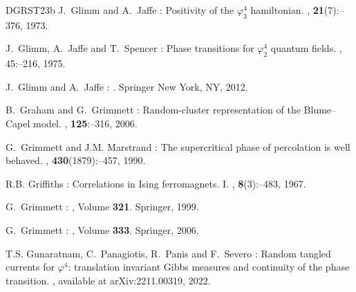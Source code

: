 \documentclass[11pt,a4paper]{article}
\theoremstyle{definition}
\numberwithin{equation}{section}
\begin{document}
\begin{thebibliography}{DGRST23b}
J.~\bgroup\fonteauteurs\bgroup Glimm\egroup\egroup{} and A.~\bgroup\fonteauteurs\bgroup Jaffe\egroup\egroup{} :
\newblock Positivity of the $\varphi^4_3$ hamiltonian.
, \textbf{21}(7)\string:--376, 1973.

J.~\bgroup\fonteauteurs\bgroup Glimm\egroup\egroup{}, A.~\bgroup\fonteauteurs\bgroup Jaffe\egroup\egroup{} and T.~\bgroup\fonteauteurs\bgroup Spencer\egroup\egroup{} :
\newblock Phase transitions for $\varphi^4_2$ quantum fields.
, 45\string:--216, 1975.

J.~\bgroup\fonteauteurs\bgroup Glimm\egroup\egroup{} and A.~\bgroup\fonteauteurs\bgroup Jaffe\egroup\egroup{} :
.
\newblock Springer New York, NY, 2012.

B.~\bgroup\fonteauteurs\bgroup Graham\egroup\egroup{} and G.~\bgroup\fonteauteurs\bgroup Grimmett\egroup\egroup{} :
\newblock Random-cluster representation of the Blume--Capel model.
, \textbf{125}\string:--316, 2006.

G.~\bgroup\fonteauteurs\bgroup Grimmett\egroup\egroup{} and J.M. \bgroup\fonteauteurs\bgroup Marstrand\egroup\egroup{} :
\newblock The supercritical phase of percolation is well behaved.
, \textbf{430}(1879)\string:--457, 1990.


R.B. \bgroup\fonteauteurs\bgroup Griffiths\egroup\egroup{} :
\newblock Correlations in {I}sing ferromagnets. {I}.
, \textbf{8}(3)\string:--483, 1967.

G.~\bgroup\fonteauteurs\bgroup Grimmett\egroup\egroup{} :
, Volume \textbf{321}.
\newblock Springer, 1999.

G.~\bgroup\fonteauteurs\bgroup Grimmett\egroup\egroup{} :
, Volume \textbf{333}.
\newblock Springer, 2006.

T.S. \bgroup\fonteauteurs\bgroup Gunaratnam\egroup\egroup{}, C.~\bgroup\fonteauteurs\bgroup Panagiotis\egroup\egroup{}, R.~\bgroup\fonteauteurs\bgroup Panis\egroup\egroup{} and F.~\bgroup\fonteauteurs\bgroup Severo\egroup\egroup{} :
\newblock Random tangled currents for $\varphi^4$: translation invariant {G}ibbs measures and continuity of the phase transition.
, available at arXiv:2211.00319, 2022.


\end{thebibliography}
\end{document}
